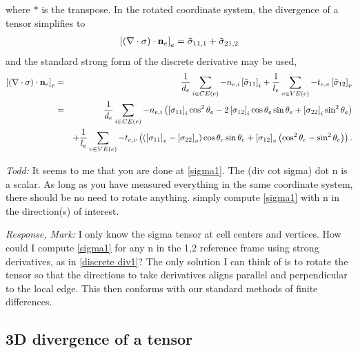 \documentclass[11pt]{report}
\begin{document}
where $*$ is the transpose.  In the rotated coordinate system, the divergence of a tensor simplifies to
\begin{eqnarray}
\left[(\nabla\cdot\sigma)\cdot{\bf n}_e\right]_e =   \tilde\sigma_{11,1} + \tilde\sigma_{21,2}
\end{eqnarray}
and the standard strong form of the discrete derivative \cite[equation 22]{Ringler_ea10jcp} may be used,
\begin{eqnarray}
\label{discrete div1}
\left[(\nabla\cdot\sigma)\cdot{\bf n}_e\right]_e
 &=& \frac{1}{d_e} \sum_{i\in CE(e)}-n_{e,i}\left[\tilde\sigma_{11}\right]_i
   + \frac{1}{l_e} \sum_{v\in VE(e)}-t_{e,v}\left[\tilde\sigma_{12}\right]_v
\\
 &=& \frac{1}{d_e} \sum_{i\in CE(e)}-n_{e,i}\left(
\left[\sigma_{11}\right]_i\cos^2{\theta_e} - 2\left[\sigma_{12}\right]_i\cos{\theta_e}\sin{\theta_e} + \left[\sigma_{22}\right]_i\sin^2{\theta_e}
\right) \nonumber \\
 &&+ \frac{1}{l_e} \sum_{v\in VE(e)}-t_{e,v}\left(
  (\left[\sigma_{11}\right]_v- \left[\sigma_{22}\right]_v)\cos{\theta_e}\sin{\theta_e} + \left[\sigma_{12}\right]_v\left(\cos^2{\theta_e} - \sin^2{\theta_e} \right)  
\right).
\label{discrete div2}
\end{eqnarray}

{\it Todd:} It seems to me that you are done at \ref{sigma1}. The (div cot sigma) dot n is a scalar. As long as you have measured everything in the same coordinate system, there should be no need to rotate anything. simply compute \ref{sigma1} with n in the direction(s) of interest.

{\it Response, Mark:} I only know the sigma tensor at cell centers and vertices.  How could I compute \ref{sigma1} for any n in the 1,2 reference frame using strong derivatives, as in \ref{discrete div1}?  The only solution I can think of is to rotate the tensor so that the directions to take derivatives aligns parallel and perpendicular to the local edge.  This then conforms with our standard methods of finite differences. 

\subsection{3D divergence of a tensor}
\end{document}
